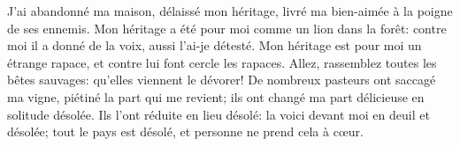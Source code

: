 J’ai abandonné ma maison, délaissé mon héritage,
	livré ma bien-aimée à la poigne de ses ennemis.
Mon héritage a été pour moi comme un lion dans la forêt:
	contre moi il a donné de la voix, aussi l’ai-je détesté.
Mon héritage est pour moi un étrange rapace, et contre lui font cercle les rapaces.
	Allez, rassemblez toutes les bêtes sauvages: qu’elles viennent le dévorer!
De nombreux pasteurs ont saccagé ma vigne, piétiné la part qui me revient;
	ils ont changé ma part délicieuse en solitude désolée.
Ils l’ont réduite en lieu désolé:
	la voici devant moi en deuil et désolée;
	tout le pays est désolé, et personne ne prend cela à cœur.
